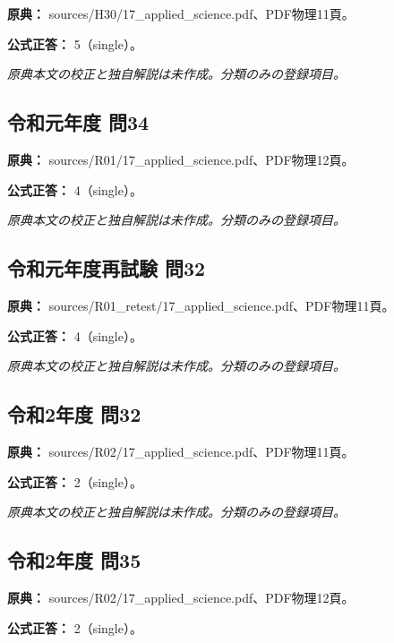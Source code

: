 \noindent\textbf{原典：} sources/H30/17\_applied\_science.pdf、PDF物理11頁。

\textbf{公式正答：} 5（single）。

\par\textit{原典本文の校正と独自解説は未作成。分類のみの登録項目。}

\subsection{令和元年度 問34}
\label{q:r01-reg-applied-34}

\noindent\textbf{原典：} sources/R01/17\_applied\_science.pdf、PDF物理12頁。

\textbf{公式正答：} 4（single）。

\par\textit{原典本文の校正と独自解説は未作成。分類のみの登録項目。}

\subsection{令和元年度再試験 問32}
\label{q:r01-ret-applied-32}

\noindent\textbf{原典：} sources/R01\_retest/17\_applied\_science.pdf、PDF物理11頁。

\textbf{公式正答：} 4（single）。

\par\textit{原典本文の校正と独自解説は未作成。分類のみの登録項目。}

\subsection{令和2年度 問32}
\label{q:r02-reg-applied-32}

\noindent\textbf{原典：} sources/R02/17\_applied\_science.pdf、PDF物理11頁。

\textbf{公式正答：} 2（single）。

\par\textit{原典本文の校正と独自解説は未作成。分類のみの登録項目。}

\subsection{令和2年度 問35}
\label{q:r02-reg-applied-35}

\noindent\textbf{原典：} sources/R02/17\_applied\_science.pdf、PDF物理12頁。

\textbf{公式正答：} 2（single）。

